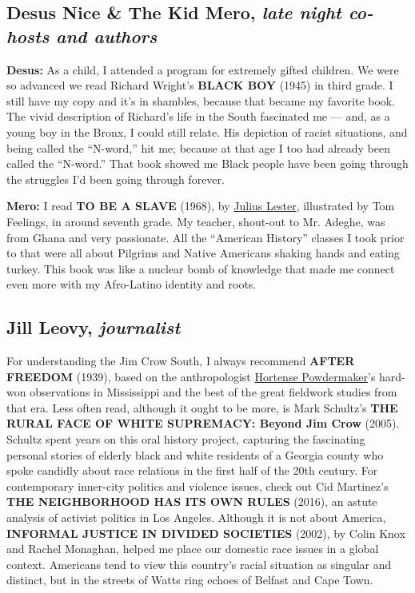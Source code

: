 \hypertarget{desus-nice--the-kid-mero-late-night-co-hosts-and-authors}{%
\subsection{\texorpdfstring{Desus Nice \& The Kid Mero, \emph{late night
co-hosts and
authors}}{Desus Nice \& The Kid Mero, late night co-hosts and authors}}\label{desus-nice--the-kid-mero-late-night-co-hosts-and-authors}}

\textbf{Desus:} As a child, I attended a program for extremely gifted
children. We were so advanced we read Richard Wright's \textbf{BLACK
BOY} (1945) in third grade. I still have my copy and it's in shambles,
because that became my favorite book. The vivid description of Richard's
life in the South fascinated me --- and, as a young boy in the Bronx, I
could still relate. His depiction of racist situations, and being called
the ``N-word,'' hit me; because at that age I too had already been
called the ``N-word.'' That book showed me Black people have been going
through the struggles I'd been going through forever.

\textbf{Mero:} I read \textbf{TO BE A SLAVE} (1968), by
\href{https://www.nytimes.com/2018/01/19/obituaries/julius-lester-chronicler-of-black-america-is-dead-at-78.html}{Julius
Lester}, illustrated by Tom Feelings, in around seventh grade. My
teacher, shout-out to Mr. Adeghe, was from Ghana and very passionate.
All the ``American History'' classes I took prior to that were all about
Pilgrims and Native Americans shaking hands and eating turkey. This book
was like a nuclear bomb of knowledge that made me connect even more with
my Afro-Latino identity and roots.

\hypertarget{jill-leovy-journalist}{%
\subsection{\texorpdfstring{Jill Leovy,
\emph{journalist}}{Jill Leovy, journalist}}\label{jill-leovy-journalist}}

For understanding the Jim Crow South, I always recommend \textbf{AFTER
FREEDOM} (1939), based on the anthropologist
\href{https://www.nytimes.com/1970/06/17/archives/hortense-powdermaker-is-dead-an-authority-on-varied-cultures.html}{Hortense
Powdermaker}'s hard-won observations in Mississippi and the best of the
great fieldwork studies from that era. Less often read, although it
ought to be more, is Mark Schultz's \textbf{THE RURAL FACE OF WHITE
SUPREMACY: Beyond Jim Crow} (2005). Schultz spent years on this oral
history project, capturing the fascinating personal stories of elderly
black and white residents of a Georgia county who spoke candidly about
race relations in the first half of the 20th century. For contemporary
inner-city politics and violence issues, check out Cid Martinez's
\textbf{THE NEIGHBORHOOD HAS ITS OWN RULES} (2016), an astute analysis
of activist politics in Los Angeles. Although it is not about America,
\textbf{INFORMAL JUSTICE IN DIVIDED SOCIETIES} (2002), by Colin Knox and
Rachel Monaghan, helped me place our domestic race issues in a global
context. Americans tend to view this country's racial situation as
singular and distinct, but in the streets of Watts ring echoes of
Belfast and Cape Town.

